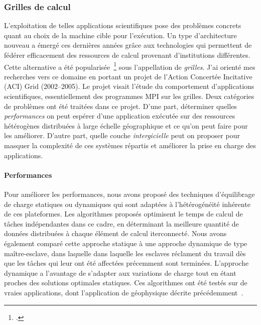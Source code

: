 \documentclass[11pt]{article}
\begin{document}
\subsubsection{Grilles de calcul}

L'exploitation de telles applications  scientifiques pose des problèmes concrets
quant au  choix de  la machine  cible pour  l'exécution. Un  type d'architecture
nouveau a émergé  ces dernières années grâce aux technologies  qui permettent de
fédérer  efficacement   des  ressources   de  calcul   provenant  d'institutions
différentes.  Cette  alternative a  été popularisée~\footcite{Foster97,Foster98}
sous  l'appellation de  \emph{grilles}.   J'ai orienté  mes  recherches vers  ce
domaine  en  portant un  projet  de  l'Action  Concertée Incitative  (ACI)  Grid
(2002--2005).   Le   projet  visait   l'étude  du   comportement  d'applications
scientifiques,  essentiellement  des  programmes  MPI  sur  les  grilles.   Deux
catégories de problèmes ont été traitées  dans ce projet. D'une part, déterminer
quelles \emph{performances} on  peut espérer d'une application  exécutée sur des
ressources hétérogènes distribuées à large échelle géographique et ce qu'on peut
faire pour les améliorer.  D'autre part, quelle couche \emph{intergicielle} peut
on proposer pour masquer la complexité  de ces systèmes répartis et améliorer la
prise en charge des applications.


\paragraph{Performances} 

Pour améliorer les performances, nous avons proposé des techniques d'équilibrage
de charge statiques ou dynamiques  qui sont adaptées à l'hétérogénéité inhérente
de ces  plateformes. Les algorithmes proposés  optimisent le temps de  calcul de
tâches  indépendantes dans  ce cadre,  en déterminant  la meilleure  quantité de
données  distribuées  à  chaque  élément de  calcul  iterconnecté.   Nous  avons
également  comparé cette  approche statique  à  une approche  dynamique de  type
maître-esclave, dans  laquelle dans laquelle  les esclaves réclament  du travail
dès   que   les   tâches   qui   leur  ont   été   affectées   précemment   sont
terminées.  L'approche dynamique  a l'avantage  de s'adapter  aux variations  de
charge tout en étant proches des solutions optimales statiques.  Ces algorithmes
ont été  testés sur  de vraies applications,  dont l'application  de géophysique
décrite précédemment~\cite{icps-2002-62,icps-2003-75,icps-2004-125}.
\end{document}
